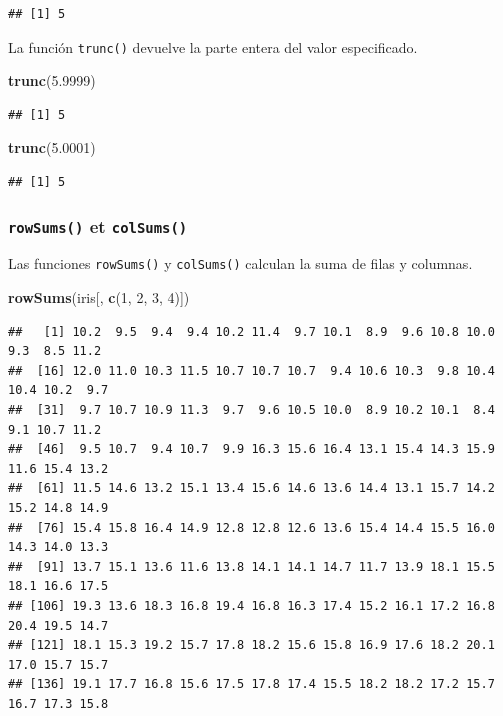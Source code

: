\documentclass[
]{book}
\newenvironment{Shaded}{\begin{snugshade}}{\end{snugshade}}
\newcommand{\DecValTok}[1]{\textcolor[rgb]{0.00,0.00,0.81}{#1}}
\newcommand{\FloatTok}[1]{\textcolor[rgb]{0.00,0.00,0.81}{#1}}
\newcommand{\KeywordTok}[1]{\textcolor[rgb]{0.13,0.29,0.53}{\textbf{#1}}}
\newcommand{\NormalTok}[1]{#1}
\begin{document}
\begin{verbatim}
## [1] 5
\end{verbatim}

La función \texttt{trunc()} devuelve la parte entera del valor especificado.

\begin{Shaded}
\begin{Highlighting}[]
\KeywordTok{trunc}\NormalTok{(}\FloatTok{5.9999}\NormalTok{)}
\end{Highlighting}
\end{Shaded}

\begin{verbatim}
## [1] 5
\end{verbatim}

\begin{Shaded}
\begin{Highlighting}[]
\KeywordTok{trunc}\NormalTok{(}\FloatTok{5.0001}\NormalTok{)}
\end{Highlighting}
\end{Shaded}

\begin{verbatim}
## [1] 5
\end{verbatim}

\hypertarget{l015rowsums}{%
\subsubsection{\texorpdfstring{\texttt{rowSums()} et \texttt{colSums()}}{rowSums() et colSums()}}\label{l015rowsums}}

Las funciones \texttt{rowSums()} y \texttt{colSums()} calculan la suma de filas y columnas.

\begin{Shaded}
\begin{Highlighting}[]
\KeywordTok{rowSums}\NormalTok{(iris[, }\KeywordTok{c}\NormalTok{(}\DecValTok{1}\NormalTok{, }\DecValTok{2}\NormalTok{, }\DecValTok{3}\NormalTok{, }\DecValTok{4}\NormalTok{)])}
\end{Highlighting}
\end{Shaded}

\begin{verbatim}
##   [1] 10.2  9.5  9.4  9.4 10.2 11.4  9.7 10.1  8.9  9.6 10.8 10.0  9.3  8.5 11.2
##  [16] 12.0 11.0 10.3 11.5 10.7 10.7 10.7  9.4 10.6 10.3  9.8 10.4 10.4 10.2  9.7
##  [31]  9.7 10.7 10.9 11.3  9.7  9.6 10.5 10.0  8.9 10.2 10.1  8.4  9.1 10.7 11.2
##  [46]  9.5 10.7  9.4 10.7  9.9 16.3 15.6 16.4 13.1 15.4 14.3 15.9 11.6 15.4 13.2
##  [61] 11.5 14.6 13.2 15.1 13.4 15.6 14.6 13.6 14.4 13.1 15.7 14.2 15.2 14.8 14.9
##  [76] 15.4 15.8 16.4 14.9 12.8 12.8 12.6 13.6 15.4 14.4 15.5 16.0 14.3 14.0 13.3
##  [91] 13.7 15.1 13.6 11.6 13.8 14.1 14.1 14.7 11.7 13.9 18.1 15.5 18.1 16.6 17.5
## [106] 19.3 13.6 18.3 16.8 19.4 16.8 16.3 17.4 15.2 16.1 17.2 16.8 20.4 19.5 14.7
## [121] 18.1 15.3 19.2 15.7 17.8 18.2 15.6 15.8 16.9 17.6 18.2 20.1 17.0 15.7 15.7
## [136] 19.1 17.7 16.8 15.6 17.5 17.8 17.4 15.5 18.2 18.2 17.2 15.7 16.7 17.3 15.8
\end{verbatim}
\end{document}
